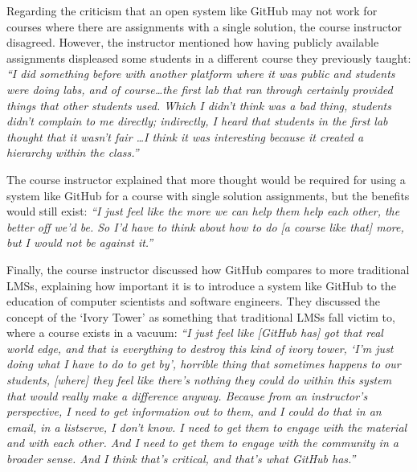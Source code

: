 
Regarding the criticism that an open system like GitHub may not work for courses where there are assignments with a single solution, the course instructor disagreed. However, the instructor mentioned how having publicly available assignments displeased some students in a different course they previously taught: \textit{``I did something before with another platform where it was public and students were doing labs, and of course\ldots the first lab that ran through certainly provided things that other students used. Which I didn't think was a bad thing, students didn't complain to me directly; indirectly, I heard that students in the first lab thought that it wasn't fair \ldots I think it was interesting because it created a hierarchy within the class.''}

The course instructor explained that more thought would be required for using a system like GitHub for a course with single solution assignments, but the benefits would still exist: \textit{``I just feel like the more we can help them help each other, the better off we'd be. So I'd have to think about how to do [a course like that] more, but I would not be against it.''}

Finally, the course instructor discussed how GitHub compares to more traditional LMSs, explaining how important it is to introduce a system like GitHub to the education of computer scientists and software engineers. They discussed the concept of the `Ivory Tower' as something that traditional LMSs fall victim to, where a course exists in a vacuum: \textit{``I just feel like [GitHub has] got that real world edge, and that is everything to destroy this kind of ivory tower, `I'm just doing what I have to do to get by', horrible thing that sometimes happens to our students, [where] they feel like there's nothing they could do within this system that would really make a difference anyway. Because from an instructor's perspective, I need to get information out to them, and I could do that in an email, in a listserve, I don't know. I need to get them to engage with the material and with each other. And I need to get them to engage with the community in a broader sense. And I think that's critical, and that's what GitHub has.''}

